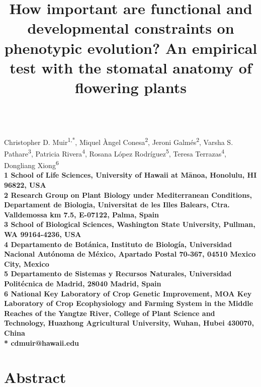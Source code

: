 \documentclass[
  12pt,
]{article}
\title{How important are functional and developmental constraints on phenotypic evolution? An empirical test with the stomatal anatomy of flowering plants}
\author{}
\date{\vspace{-2.5em}}
\author{}
\date{}
\begin{document}
\begin{flushleft}
{\Large
\textbf{}
}
\newline
\\
Christopher D. Muir\textsuperscript{1,*},
Miquel \`{A}ngel Conesa\textsuperscript{2},
Jeroni Galm\'{e}s\textsuperscript{2},
Varsha S. Pathare\textsuperscript{3},
Patricia Rivera\textsuperscript{4},
Rosana López Rodríguez\textsuperscript{5},
Teresa Terrazas\textsuperscript{4},
Dongliang Xiong\textsuperscript{6}
\\
\bigskip
\bf{1} School of Life Sciences, University of Hawaii at M\=anoa, Honolulu, HI 96822, USA \\
\bf{2} Research Group on Plant Biology under Mediterranean Conditions, Departament de Biologia, Universitat de les Illes Balears, Ctra. Valldemossa km 7.5, E-07122, Palma, Spain \\
\bf{3} School of Biological Sciences, Washington State University, Pullman, WA 99164-4236, USA \\
\bf{4} Departamento de Botánica, Instituto de Biología, Universidad Nacional Autónoma de México, Apartado Postal 70‑367, 04510 Mexico City, Mexico \\
\bf{5} Departamento de Sistemas y Recursos Naturales, Universidad Politécnica de Madrid, 28040 Madrid, Spain \\
\bf{6} National Key Laboratory of Crop Genetic Improvement, MOA Key Laboratory of Crop Ecophysiology and Farming System in the Middle Reaches of the Yangtze River, College of Plant Science and Technology, Huazhong Agricultural University, Wuhan, Hubei 430070, China\\
\bigskip
* cdmuir@hawaii.edu

\end{flushleft}

\linenumbers{}
\modulolinenumbers[3]

\hypertarget{abstract}{%
\section{Abstract}\label{abstract}}
\end{document}
